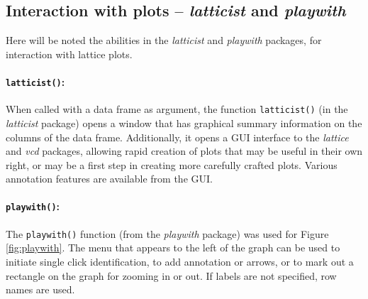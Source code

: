 \documentclass{tufte-book}\usepackage[]{graphicx}\usepackage[]{color}
\newcommand{\txtt}[1]{\texttt{#1}}
\begin{document}
\subsection{Interaction with plots -- \textit{latticist} and
  \textit{playwith}}\label{ssec:playwith}

  Here will be noted the
abilities in the \textit{latticist} and \textit{playwith} packages,
for interaction with lattice plots.

\paragraph{\texttt{latticist()}:}
When called with a data frame as argument, the function
\txtt{latticist()} (in the \textit{latticist} package) opens a
window that has graphical summary information on the columns of the
data frame.  Additionally, it opens a GUI interface to the
\textit{lattice} and \textit{vcd} packages, allowing rapid creation of
plots that may be useful in their own right, or may be a first step in
creating more carefully crafted plots.  Various annotation features
are available from the GUI.

\paragraph{\texttt{playwith()}:}
The \texttt{playwith()}  function (from the \textit{playwith}
package) was used for Figure \ref{fig:playwith}.  The menu that
appears to the left of the graph can be used to initiate single
click identification, to add annotation or arrows, or to mark
out a rectangle on the graph for zooming in or out.  If labels
are not specified, row names are used.
\vspace*{6pt}
\end{document}
